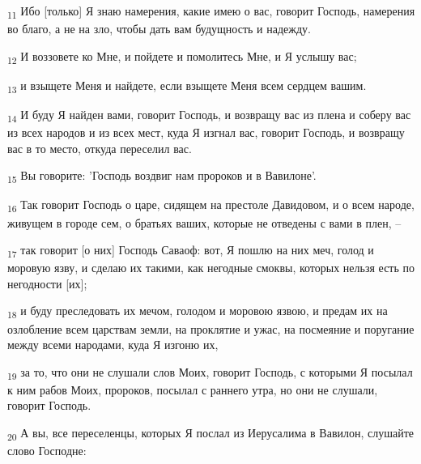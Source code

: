\begin{tcolorbox}
\textsubscript{11} Ибо [только] Я знаю намерения, какие имею о вас, говорит Господь, намерения во благо, а не на зло, чтобы дать вам будущность и надежду.
\end{tcolorbox}
\begin{tcolorbox}
\textsubscript{12} И воззовете ко Мне, и пойдете и помолитесь Мне, и Я услышу вас;
\end{tcolorbox}
\begin{tcolorbox}
\textsubscript{13} и взыщете Меня и найдете, если взыщете Меня всем сердцем вашим.
\end{tcolorbox}
\begin{tcolorbox}
\textsubscript{14} И буду Я найден вами, говорит Господь, и возвращу вас из плена и соберу вас из всех народов и из всех мест, куда Я изгнал вас, говорит Господь, и возвращу вас в то место, откуда переселил вас.
\end{tcolorbox}
\begin{tcolorbox}
\textsubscript{15} Вы говорите: 'Господь воздвиг нам пророков и в Вавилоне'.
\end{tcolorbox}
\begin{tcolorbox}
\textsubscript{16} Так говорит Господь о царе, сидящем на престоле Давидовом, и о всем народе, живущем в городе сем, о братьях ваших, которые не отведены с вами в плен, --
\end{tcolorbox}
\begin{tcolorbox}
\textsubscript{17} так говорит [о них] Господь Саваоф: вот, Я пошлю на них меч, голод и моровую язву, и сделаю их такими, как негодные смоквы, которых нельзя есть по негодности [их];
\end{tcolorbox}
\begin{tcolorbox}
\textsubscript{18} и буду преследовать их мечом, голодом и моровою язвою, и предам их на озлобление всем царствам земли, на проклятие и ужас, на посмеяние и поругание между всеми народами, куда Я изгоню их,
\end{tcolorbox}
\begin{tcolorbox}
\textsubscript{19} за то, что они не слушали слов Моих, говорит Господь, с которыми Я посылал к ним рабов Моих, пророков, посылал с раннего утра, но они не слушали, говорит Господь.
\end{tcolorbox}
\begin{tcolorbox}
\textsubscript{20} А вы, все переселенцы, которых Я послал из Иерусалима в Вавилон, слушайте слово Господне:
\end{tcolorbox}
